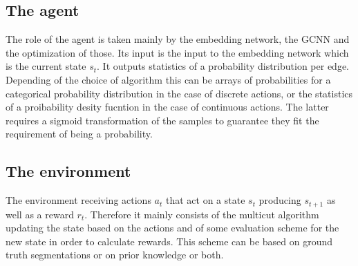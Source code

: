 \subsection{The agent}
The role of the agent is taken mainly by the embedding network, the GCNN and the optimization of those. Its input is the input to the embedding network which is the current state $s_t$. It outputs statistics of a probability distribution per edge. Depending of the choice of algorithm this can be arrays of probabilities for a categorical probability distribution in the case of discrete actions, or the statistics of a proibability desity fucntion in the case of continuous actions. The latter requires a sigmoid transformation of the samples to guarantee they fit the requirement of being a probability.

\subsection{The environment}
The environment receiving actions $a_t$ that act on a state $s_t$ producing $s_{t+1}$ as well as a reward $r_t$. Therefore it mainly consists of the multicut algorithm updating the state based on the actions and of some evaluation scheme for the new state in order to calculate rewards. This scheme can be based on ground truth segmentations or on prior knowledge or both.

